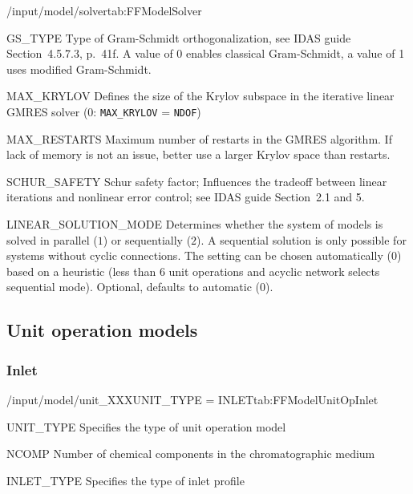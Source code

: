 \begin{groupscope}{/input/model/solver}{tab:FFModelSolver}
  \begin{dataset}[type=int,range={$\{0, 1\}$},length=1]{GS\_TYPE}
    Type of Gram-Schmidt orthogonalization, see IDAS guide Section~4.5.7.3, p.~41f.
    A value of $0$ enables classical Gram-Schmidt, a value of 1 uses modified Gram-Schmidt.
  \end{dataset}
  \begin{dataset}[type=int,range={$\{0, \dots, \texttt{NDOF}\}$},length=1]{MAX\_KRYLOV}
    Defines the size of the Krylov subspace in the iterative linear GMRES solver (0: \texttt{MAX\_KRYLOV} = \texttt{NDOF})
  \end{dataset}
  \begin{dataset}[type=int,range={$\geq 0$},length=1]{MAX\_RESTARTS}
    Maximum number of restarts in the GMRES algorithm. If lack of memory is not an issue, better use a larger Krylov space than restarts.
  \end{dataset}
  \begin{dataset}[type=double,range={$\geq 0$},length=1]{SCHUR\_SAFETY}
    Schur safety factor; Influences the tradeoff between linear iterations and nonlinear error control; see IDAS guide Section~2.1 and 5.
  \end{dataset}
  \begin{dataset}[type=int,range={$\{ 0,1,2 \}$},length=1]{LINEAR\_SOLUTION\_MODE}
    Determines whether the system of models is solved in parallel ($1$) or sequentially ($2$).
    A sequential solution is only possible for systems without cyclic connections.
    The setting can be chosen automatically ($0$) based on a heuristic (less than $6$ unit operations and acyclic network selects sequential mode).
    Optional, defaults to automatic ($0$).
  \end{dataset}
\end{groupscope}

\subsection{Unit operation models}\label{sec:FFModelUnitOp}

\subsubsection{Inlet}

\begin{condsubgroup}{/input/model/unit\_XXX}{UNIT\_TYPE = INLET}{tab:FFModelUnitOpInlet}
  \begin{dataset}[type=string,range={\texttt{INLET}},length=1]{UNIT\_TYPE}
    Specifies the type of unit operation model
  \end{dataset}
  \begin{dataset}[type=int,range={$\geq 1$},length=1]{NCOMP}
    Number of chemical components in the chromatographic medium
  \end{dataset}
  \begin{dataset}[type=string,range={\texttt{PIECEWISE\_CUBIC\_POLY}},length=1]{INLET\_TYPE}
    Specifies the type of inlet profile
  \end{dataset}
\end{condsubgroup}

